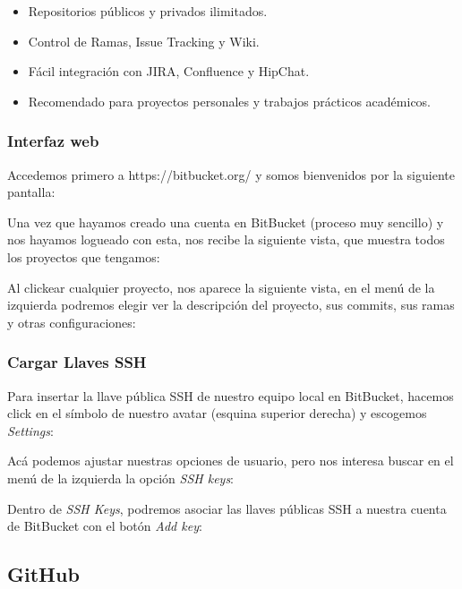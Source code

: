 \documentclass{article}
\begin{document}
\begin{itemize}
\item Repositorios públicos y privados ilimitados.
\item Control de Ramas, Issue Tracking y Wiki.
\item Fácil integración con JIRA, Confluence y HipChat.
\item Recomendado para proyectos personales y trabajos prácticos académicos.
\end{itemize}

\subsubsection{Interfaz web}

Accedemos primero a \textsf{https://bitbucket.org/} y somos bienvenidos por la siguiente pantalla:

Una vez que hayamos creado una cuenta en BitBucket (proceso muy sencillo) y nos hayamos logueado con esta, nos recibe la siguiente vista, que muestra todos los proyectos que tengamos:

Al clickear cualquier proyecto, nos aparece la siguiente vista, en el menú de la izquierda podremos elegir ver la descripción del proyecto, sus commits, sus ramas y otras configuraciones:

\subsubsection{Cargar Llaves SSH}
Para insertar la llave pública SSH de nuestro equipo local en BitBucket, hacemos click en el símbolo de nuestro avatar (esquina superior derecha) y escogemos \textit{Settings}:

Acá podemos ajustar nuestras opciones de usuario, pero nos interesa buscar en el menú de la izquierda la opción \textit{SSH keys}:

Dentro de \textit{SSH Keys}, podremos asociar las llaves públicas SSH a nuestra cuenta de BitBucket con el botón \textit{Add key}:

\pagebreak

\subsection{GitHub}
\end{document}
